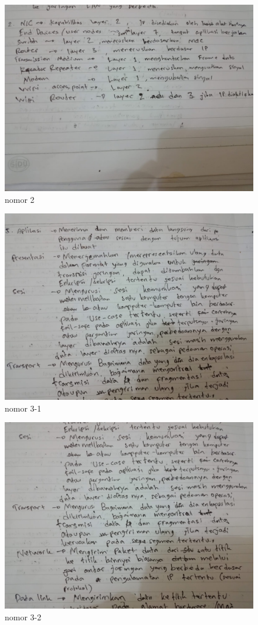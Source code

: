 \documentclass{article}
\begin{document}
  \begin{figure}
    \centering
    \includegraphics[width=\textwidth]{2.jpeg}
    \caption{nomor 2}
  \end{figure}
  \begin{figure}
    \centering
    \includegraphics[width=\textwidth]{3-1.jpeg}
    \caption{nomor 3-1}
  \end{figure}
  \begin{figure}
    \centering
    \includegraphics[width=\textwidth]{3-2.jpeg}
    \caption{nomor 3-2}
  \end{figure}
\end{document}
